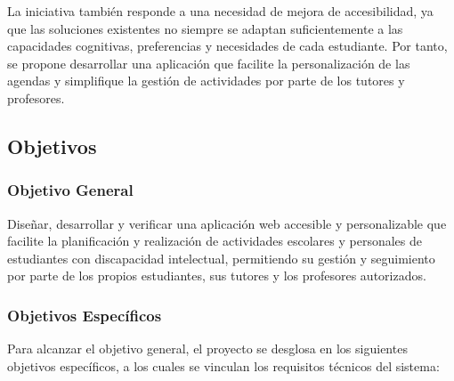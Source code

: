 La iniciativa también responde a una necesidad de mejora de accesibilidad, ya que las soluciones existentes no siempre se adaptan suficientemente a las capacidades cognitivas, preferencias y necesidades de cada estudiante. Por tanto, se propone desarrollar una aplicación que facilite la personalización de las agendas y simplifique la gestión de actividades por parte de los tutores y profesores.

\subsection{Objetivos}

\subsubsection{Objetivo General}
Diseñar, desarrollar y verificar una aplicación web accesible y personalizable que facilite la planificación y realización de actividades escolares y personales de estudiantes con discapacidad intelectual, permitiendo su gestión y seguimiento por parte de los propios estudiantes, sus tutores y los profesores autorizados.

\subsubsection{Objetivos Específicos}

Para alcanzar el objetivo general, el proyecto se desglosa en los siguientes objetivos específicos, a los cuales se vinculan los requisitos técnicos del sistema:

